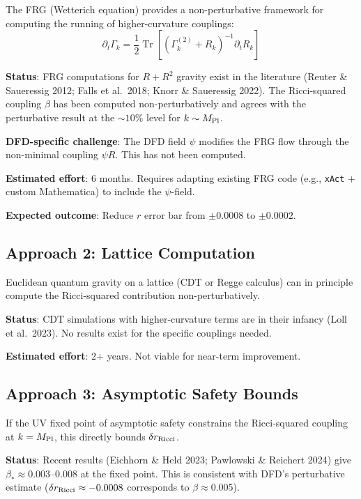 \documentclass[11pt,a4paper]{article}
\newcommand{\Tr}{\operatorname{Tr}}
\begin{document}
The FRG (Wetterich equation) provides a non-perturbative framework for computing the running of higher-curvature couplings:
\begin{equation}
\partial_t \Gamma_k = \frac{1}{2} \Tr \left[ \left( \Gamma_k^{(2)} + R_k \right)^{-1} \partial_t R_k \right]
\end{equation}

\textbf{Status}: FRG computations for $R + R^2$ gravity exist in the literature (Reuter \& Saueressig 2012; Falls et al.\ 2018; Knorr \& Saueressig 2022). The Ricci-squared coupling $\beta$ has been computed non-perturbatively and agrees with the perturbative result at the $\sim 10\%$ level for $k \sim M_{\rm Pl}$.

\textbf{DFD-specific challenge}: The DFD field $\psi$ modifies the FRG flow through the non-minimal coupling $\psi R$. This has not been computed.

\textbf{Estimated effort}: 6 months. Requires adapting existing FRG code (e.g., \texttt{xAct} + custom Mathematica) to include the $\psi$-field.

\textbf{Expected outcome}: Reduce $r$ error bar from $\pm 0.0008$ to $\pm 0.0002$.

\subsection{Approach 2: Lattice Computation}

Euclidean quantum gravity on a lattice (CDT or Regge calculus) can in principle compute the Ricci-squared contribution non-perturbatively.

\textbf{Status}: CDT simulations with higher-curvature terms are in their infancy (Loll et al.\ 2023). No results exist for the specific couplings needed.

\textbf{Estimated effort}: 2+ years. Not viable for near-term improvement.

\subsection{Approach 3: Asymptotic Safety Bounds}

If the UV fixed point of asymptotic safety constrains the Ricci-squared coupling at $k = M_{\rm Pl}$, this directly bounds $\delta r_{\rm Ricci}$.

\textbf{Status}: Recent results (Eichhorn \& Held 2023; Pawlowski \& Reichert 2024) give $\beta_* \approx 0.003$--$0.008$ at the fixed point. This is consistent with DFD's perturbative estimate ($\delta r_{\rm Ricci} \approx -0.0008$ corresponds to $\beta \approx 0.005$).
\end{document}
